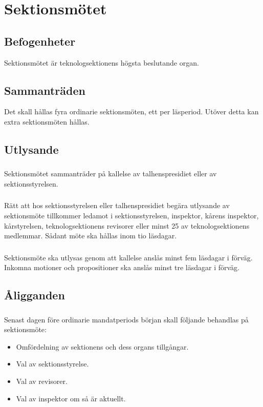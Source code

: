 \documentclass[a4paper]{dtek}
\begin{document}
\section{Sektionsmötet}
\subsection{Befogenheter}
Sektionsmötet är teknologsektionens högsta beslutande organ.
\subsection{Sammanträden}
Det skall hållas fyra ordinarie sektionsmöten, ett per läsperiod. Utöver detta kan extra sektionsmöten hållas.
\subsection{Utlysande}
\subsubsection{}
Sektionsmötet sammanträder på kallelse av talhenspresidiet eller av sektionsstyrelsen.
\subsubsection{}
Rätt att hos sektionsstyrelsen eller talhenspresidiet begära utlysande av sektionsmöte tillkommer ledamot i sektionsstyrelsen, inspektor, kårens inspektor, kårstyrelsen, teknologsektionens revisorer eller minst 25 av teknologsektionens medlemmar. Sådant möte ska hållas inom tio läsdagar.
\subsubsection{}
\label{sec:sektionsmote_utlysande}
Sektionsmöte ska utlysas genom att kallelse anslås minst fem läsdagar i förväg.
Inkomna motioner och propositioner ska anslås minst tre läsdagar i förväg.
\subsection{Åligganden}
\subsubsection{}
Senast dagen före ordinarie mandatperiods början skall följande behandlas på sektionsmöte:
\begin{itemize}
\item Omfördelning av sektionens och dess organs tillgångar.
\item Val av sektionsstyrelse.
\item Val av revisorer.
\item Val av inspektor om så är aktuellt.
\end{itemize}
\end{document}
